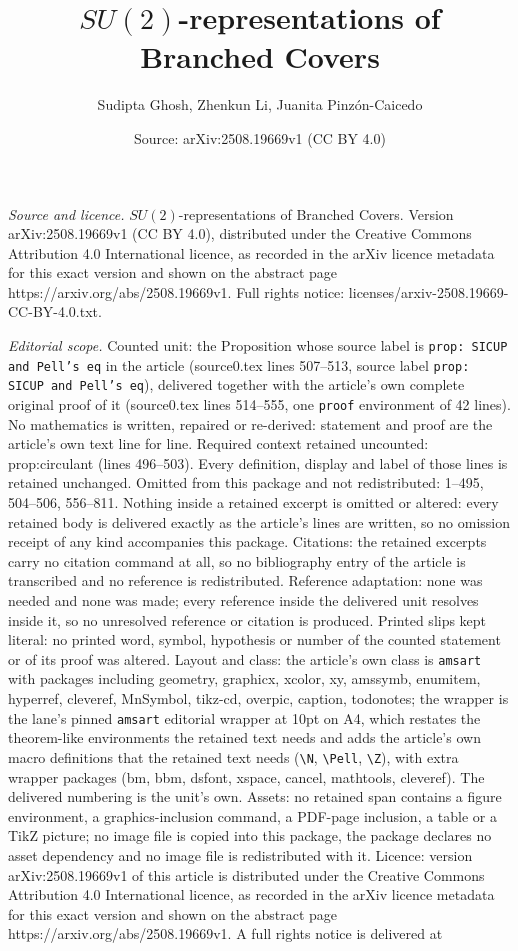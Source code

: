 \documentclass[10pt,a4paper]{amsart}
\title[$SU(2)$-representations of Branched Covers]{$SU(2)$-representations of Branched Covers}
\author{Sudipta Ghosh, Zhenkun Li, Juanita Pinz\'on-Caicedo}
\date{Source: arXiv:2508.19669v1 (CC BY 4.0)}
\begin{document}
\maketitle

\noindent\emph{Source and licence.} $SU(2)$-representations of Branched Covers. Version arXiv:2508.19669v1 (CC BY 4.0), distributed under the Creative Commons Attribution 4.0 International licence, as recorded in the arXiv licence metadata for this exact version and shown on the abstract page https://arxiv.org/abs/2508.19669v1. Full rights notice: licenses/arxiv-2508.19669-CC-BY-4.0.txt.\par\smallskip

\noindent\textit{Editorial scope.} Counted unit: the Proposition whose source label is \texttt{prop: SICUP and Pell's eq} in the article (source0.tex lines 507--513, source label \texttt{prop: SICUP and Pell's eq}), delivered together with the article's own complete original proof of it (source0.tex lines 514--555, one \texttt{proof} environment of 42 lines). No mathematics is written, repaired or re-derived: statement and proof are the article's own text line for line. Required context retained uncounted: prop:circulant (lines 496--503). Every definition, display and label of those lines is retained unchanged. Omitted from this package and not redistributed: 1--495, 504--506, 556--811. Nothing inside a retained excerpt is omitted or altered: every retained body is delivered exactly as the article's lines are written, so no omission receipt of any kind accompanies this package. Citations: the retained excerpts carry no citation command at all, so no bibliography entry of the article is transcribed and no reference is redistributed. Reference adaptation: none was needed and none was made; every reference inside the delivered unit resolves inside it, so no unresolved reference or citation is produced. Printed slips kept literal: no printed word, symbol, hypothesis or number of the counted statement or of its proof was altered. Layout and class: the article's own class is \texttt{amsart} with packages including geometry, graphicx, xcolor, xy, amssymb, enumitem, hyperref, cleveref, MnSymbol, tikz-cd, overpic, caption, todonotes; the wrapper is the lane's pinned \texttt{amsart} editorial wrapper at 10pt on A4, which restates the theorem-like environments the retained text needs and adds the article's own macro definitions that the retained text needs (\texttt{\textbackslash N}, \texttt{\textbackslash Pell}, \texttt{\textbackslash Z}), with extra wrapper packages (bm, bbm, dsfont, xspace, cancel, mathtools, cleveref). The delivered numbering is the unit's own. Assets: no retained span contains a figure environment, a graphics-inclusion command, a PDF-page inclusion, a table or a TikZ picture; no image file is copied into this package, the package declares no asset dependency and no image file is redistributed with it. Licence: version arXiv:2508.19669v1 of this article is distributed under the Creative Commons Attribution 4.0 International licence, as recorded in the arXiv licence metadata for this exact version and shown on the abstract page https://arxiv.org/abs/2508.19669v1. A full rights notice is delivered at 
\end{document}

